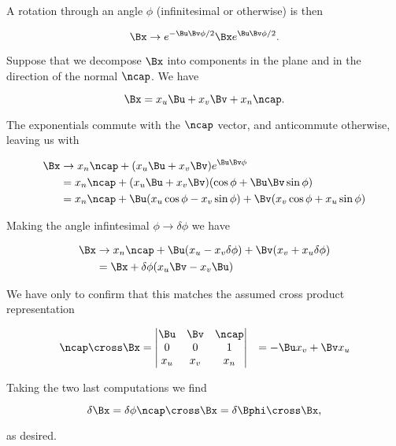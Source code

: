 A rotation through an angle $\phi$ (infinitesimal or otherwise) is then

\begin{equation}\label{eqn:continuumL6:n}
\Bx \rightarrow 
e^{-\Bu \Bv \phi/2} \Bx e^{\Bu \Bv \phi/2}.
\end{equation}

Suppose that we decompose $\Bx$ into components in the plane and in the direction of the normal $\ncap$.  We have

\begin{equation}\label{eqn:continuumL6:n}
\Bx = x_u \Bu + x_v \Bv + x_n \ncap.
\end{equation}

The exponentials commute with the $\ncap$ vector, and anticommute otherwise, leaving us with

\begin{align*}
\Bx 
&\rightarrow 
x_n \ncap + 
(x_u \Bu + x_v \Bv) e^{\Bu \Bv \phi} \\
&=
x_n \ncap + 
(x_u \Bu + x_v \Bv) (\cos\phi + \Bu \Bv \sin\phi) \\
&=
x_n \ncap + 
\Bu (x_u \cos\phi - x_v \sin\phi) 
+
\Bv (x_v \cos\phi + x_u \sin\phi) 
\end{align*}

Making the angle infintesimal $\phi \rightarrow \delta \phi$ we have

\begin{align*}
\Bx 
&\rightarrow 
x_n \ncap + 
\Bu (x_u - x_v \delta\phi) 
+
\Bv (x_v + x_u \delta\phi)  \\
&=
\Bx + \delta\phi( x_u \Bv - x_v \Bu)
\end{align*}

We have only to confirm that this matches the assumed cross product representation

\begin{align*}
\ncap \cross \Bx
&=
\begin{vmatrix}
\Bu & \Bv & \ncap \\
0 & 0 & 1 \\
x_u & x_v & x_n
\end{vmatrix}
&=-\Bu x_v + \Bv x_u
\end{align*}

Taking the two last computations we find

\begin{equation}\label{eqn:continuumL6:n}
\delta \Bx = \delta \phi \ncap \cross \Bx = \delta \Bphi \cross \Bx,
\end{equation}

as desired.

\EndArticle
